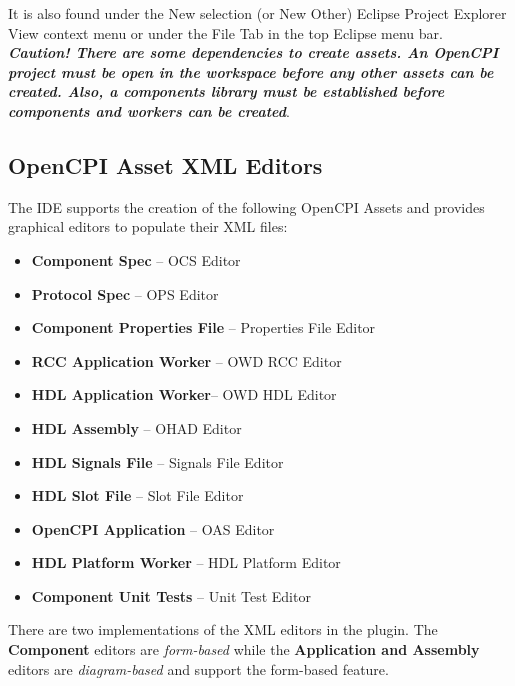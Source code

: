 \documentclass[10pt, a4paper, oneside]{article}
\begin{document}
It is also found under the New selection (or New Other) Eclipse Project Explorer View context menu or under the File Tab in the top Eclipse menu bar.\\

\textbf{\emph{Caution! There are some dependencies to create assets. An OpenCPI project must be open in the workspace before any other assets can be created. Also, a components library must be established before components and workers can be created}}.

\subsection{OpenCPI Asset XML Editors}
The IDE supports the creation of the following OpenCPI Assets and provides graphical editors to populate their XML files:
\begin{itemize}
\item \textbf{Component Spec} – OCS Editor
\item \textbf{Protocol Spec} – OPS Editor
\item \textbf{Component Properties File} – Properties File Editor
\item \textbf{RCC Application Worker} – OWD RCC Editor
\item \textbf{HDL Application Worker}– OWD HDL Editor
\item \textbf{HDL Assembly} – OHAD Editor
\item \textbf{HDL Signals File} – Signals File Editor
\item \textbf{HDL Slot File} – Slot File Editor
\item \textbf{OpenCPI Application} – OAS Editor
\item \textbf{HDL Platform Worker} – HDL Platform Editor
\item \textbf{Component Unit Tests} – Unit Test Editor
\end{itemize}
There are two implementations of the XML editors in the plugin. The \textbf{Component} editors are \emph{form-based} while the \textbf{Application and Assembly} editors are \emph{diagram-based} and support the form-based feature.
\end{document}
